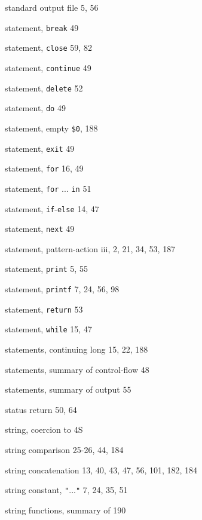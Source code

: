 \begin{multicols}{3}
\hangindent=4pc  standard output file 5, 56

\hangindent=4pc  statement, \verb'break' 49

\hangindent=4pc  statement, \verb'close' 59, 82

\hangindent=4pc  statement, \verb'continue' 49

\hangindent=4pc  statement, \verb'delete' 52

\hangindent=4pc  statement, \verb'do' 49

\hangindent=4pc  statement, empty \verb'$0', 188

\hangindent=4pc  statement, \verb'exit' 49

\hangindent=4pc  statement, \verb'for' 16, 49

\hangindent=4pc  statement, \verb'for' ... \verb'in' 51

\hangindent=4pc  statement, \verb'if'-\verb'else' 14, 47

\hangindent=4pc  statement, \verb'next' 49

\hangindent=4pc  statement, pattern-action iii, 2, 21, 34, 53, 187

\hangindent=4pc  statement, \verb'print' 5, 55

\hangindent=4pc  statement, \verb'printf' 7, 24, 56, 98

\hangindent=4pc  statement, \verb'return' 53

\hangindent=4pc  statement, \verb'while' 15, 47

\hangindent=4pc  statements, continuing long 15, 22, 188

\hangindent=4pc  statements, summary of control-flow 48

\hangindent=4pc  statements, summary of output 55

\hangindent=4pc  status return 50, 64

\hangindent=4pc  string, coercion to 4S

\hangindent=4pc  string comparison 25-26, 44, 184

\hangindent=4pc  string concatenation 13, 40, 43,  47, 56, 101, 182, 184

\hangindent=4pc  string constant, \verb'"'...\verb'"' 7, 24, 35, 51

\hangindent=4pc  string functions, summary of 190


\end{multicols}
